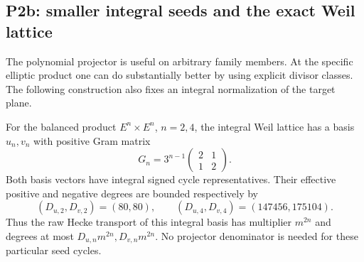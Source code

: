 \subsection*{P2b: smaller integral seeds and the exact Weil lattice}
The polynomial projector is useful on arbitrary family members. At the specific elliptic product one can do substantially better by using explicit divisor classes. The following construction also fixes an integral normalization of the target plane.

\begin{proposition}\label{P2b}
For the balanced product $E^n\times E^n$, $n=2,4$, the integral Weil lattice has a basis $u_n,v_n$ with positive Gram matrix
\begin{equation}\label{eq:WeilGram}
 G_n=3^{n-1}\begin{pmatrix}2&1\\1&2\end{pmatrix}.
\end{equation}
Both basis vectors have integral signed cycle representatives. Their effective positive and negative degrees are bounded respectively by
\[
 (D_{u,2},D_{v,2})=(80,80),\qquad
 (D_{u,4},D_{v,4})=(147456,175104).
\]
Thus the raw Hecke transport of this integral basis has multiplier $m^{2n}$ and degrees at most $D_{u,n}m^{2n},D_{v,n}m^{2n}$. No projector denominator is needed for these particular seed cycles.
\end{proposition}
